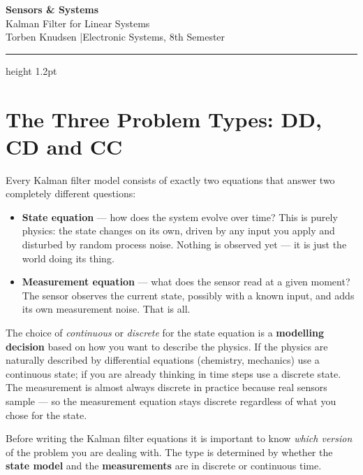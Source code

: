 \documentclass[12pt, a4paper]{article}
\begin{document}
\begin{center}
  {\LARGE\bfseries\color{headernavy} Sensors \& Systems}\\[4pt]
  {\large Kalman Filter for Linear Systems}\\[2pt]
  {\normalsize Torben Knudsen \quad|\quad Electronic Systems, 8th Semester}
\end{center}

\vspace{4pt}\hrule height 1.2pt\vspace{12pt}

\section*{The Three Problem Types: DD, CD and CC}

Every Kalman filter model consists of exactly two equations that
answer two completely different questions:

\begin{itemize}[leftmargin=1.4em]
  \item \textbf{State equation} --- how does the system evolve over
        time?
        This is purely physics: the state changes on its own, driven
        by any input you apply and disturbed by random process noise.
        Nothing is observed yet --- it is just the world doing its
        thing.
  \item \textbf{Measurement equation} --- what does the sensor read
        at a given moment?
        The sensor observes the current state, possibly with a known
        input, and adds its own measurement noise.
        That is all.
\end{itemize}

The choice of \emph{continuous} or \emph{discrete} for the state
equation is a \textbf{modelling decision} based on how you want to
describe the physics.
If the physics are naturally described by differential equations
(chemistry, mechanics) use a continuous state; if you are already
thinking in time steps use a discrete state.
The measurement is almost always discrete in practice because real
sensors sample --- so the measurement equation stays discrete
regardless of what you chose for the state.

Before writing the Kalman filter equations it is important to know
\emph{which version} of the problem you are dealing with.
The type is determined by whether the \textbf{state model} and the
\textbf{measurements} are in discrete or continuous time.
\end{document}
